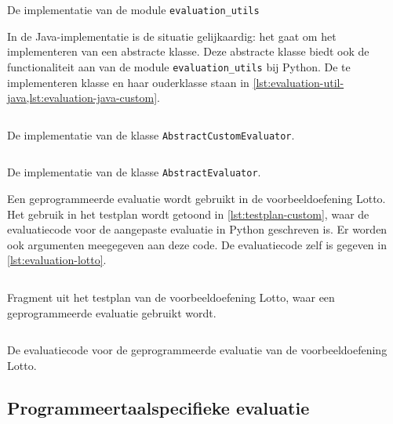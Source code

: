 \begin{listing}
    \inputminted{python}{../../judge/src/tested/languages/templates/python/evaluation_utils.py}
    \caption{De implementatie van de module \texttt{evaluation\_utils}}
    \label{lst:evaluation-util-python}
\end{listing}

In de Java-implementatie is de situatie gelijkaardig: het gaat om het implementeren van een abstracte klasse.
Deze abstracte klasse biedt ook de functionaliteit aan van de module \texttt{evaluation\_utils} bij Python.
De te implementeren klasse en haar ouderklasse staan in \cref{lst:evaluation-util-java,lst:evaluation-java-custom}.

\begin{listing}
    \inputminted{java}{../../judge/src/tested/languages/templates/java/AbstractCustomEvaluator.java}
    \caption{De implementatie van de klasse \texttt{AbstractCustomEvaluator}.}
    \label{lst:evaluation-java-custom}
\end{listing}

\begin{listing}
    \inputminted{java}{../../judge/src/tested/languages/templates/java/AbstractEvaluator.java}
    \caption{De implementatie van de klasse \texttt{AbstractEvaluator}.}
    \label{lst:evaluation-util-java}
\end{listing}

Een geprogrammeerde evaluatie wordt gebruikt in de voorbeeldoefening Lotto.
Het gebruik in het testplan wordt getoond in \cref{lst:testplan-custom}, waar de evaluatiecode voor de aangepaste evaluatie in Python geschreven is.
Er worden ook argumenten meegegeven aan deze code.
De evaluatiecode zelf is gegeven in \cref{lst:evaluation-lotto}.

\begin{listing}
    \inputminted{java}{code/testplan-custom.json}
    \caption{Fragment uit het testplan van de voorbeeldoefening Lotto, waar een geprogrammeerde evaluatie gebruikt wordt.}
    \label{lst:testplan-custom}
\end{listing}

\begin{listing}
    \inputminted{python}{../../exercise/lotto/evaluation/evaluator.py}
    \caption{De evaluatiecode voor de geprogrammeerde evaluatie van de voorbeeldoefening Lotto.}
    \label{lst:evaluation-lotto}
\end{listing}

\subsection{Programmeertaalspecifieke evaluatie}\label{subsec:programmeertaalspecifieke-evaluatie}

